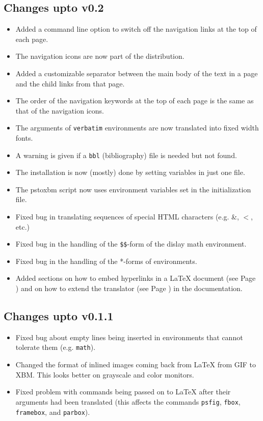 \subsection{Changes upto v0.2}
\begin{itemize}
\item Added a command line option
to switch off the navigation links
at the top of each page.
\item The navigation icons are now part of the distribution.
\item Added a customizable separator between the main body of the text
in a page and the child links from that page.
\item The order of the navigation keywords at the top of each page is
the same as that of the navigation icons.
\item The arguments of {\tt verbatim} environments are now translated
into fixed width fonts.
\item A warning is given if a {\tt bbl} (bibliography) file is 
needed but not found.
\item The installation is now (mostly) done by setting variables in 
just one file.
\item The {\fn pstoxbm} script now uses environment variables
set in the initialization file.
\item Fixed bug in translating sequences of special HTML characters
(e.g. \&, $<$, etc.)
\item Fixed bug in the handling of the \verb|$$|-form of the dislay
math environment.
\item Fixed bug in the handling of the *-forms of environments.
\item Added sections on how to embed hyperlinks in a LaTeX document 
(see Page \pageref{sec:hyper}) and on how to extend the translator
(see Page \pageref{sec:extend}) in the documentation.
\end{itemize}

\subsection{Changes upto v0.1.1}
\begin{itemize}
\item Fixed bug about empty lines being inserted in environments that
cannot tolerate them (e.g. {\tt math}).
\item Changed the format of inlined images coming back from LaTeX
from GIF to XBM. This looks better on grayscale and color monitors.
\item Fixed problem with commands being passed on to LaTeX  after
their
arguments had been translated (this affects the commands 
{\tt psfig}, {\tt fbox}, {\tt framebox}, and {\tt parbox}).
\end{itemize}
